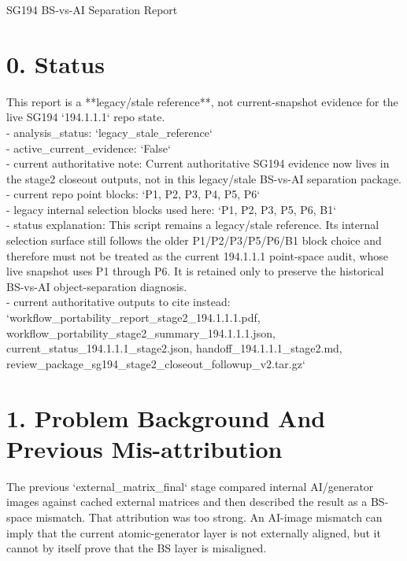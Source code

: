 \documentclass[11pt]{article}
\begin{document}
        \begin{center}
        {\LARGE SG194 BS-vs-AI Separation Report}
        \end{center}
        \section*{0. Status}

This report is a **legacy/stale reference**, not current-snapshot evidence for the live SG194 `194.1.1.1` repo state.\\

- analysis\_status: `legacy\_stale\_reference`\\
- active\_current\_evidence: `False`\\
- current authoritative note: Current authoritative SG194 evidence now lives in the stage2 closeout outputs, not in this legacy/stale BS-vs-AI separation package.\\
- current repo point blocks: `P1, P2, P3, P4, P5, P6`\\
- legacy internal selection blocks used here: `P1, P2, P3, P5, P6, B1`\\
- status explanation: This script remains a legacy/stale reference. Its internal selection surface still follows the older P1/P2/P3/P5/P6/B1 block choice and therefore must not be treated as the current 194.1.1.1 point-space audit, whose live snapshot uses P1 through P6. It is retained only to preserve the historical BS-vs-AI object-separation diagnosis.\\
- current authoritative outputs to cite instead: `workflow\_portability\_report\_stage2\_194.1.1.1.pdf, workflow\_portability\_stage2\_summary\_194.1.1.1.json, current\_status\_194.1.1.1\_stage2.json, handoff\_194.1.1.1\_stage2.md, review\_package\_sg194\_stage2\_closeout\_followup\_v2.tar.gz`\\

\section*{1. Problem Background And Previous Mis-attribution}

The previous `external\_matrix\_final` stage compared internal AI/generator images against cached external matrices and then described the result as a BS-space mismatch. That attribution was too strong. An AI-image mismatch can imply that the current atomic-generator layer is not externally aligned, but it cannot by itself prove that the BS layer is misaligned.\\
\end{document}
